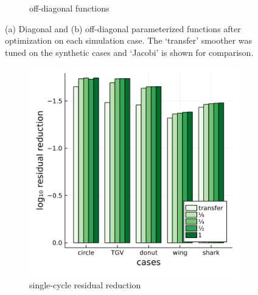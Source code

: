 \documentclass[review]{elsarticle}
\begin{document}
\begin{figure}
\begin{subfigure}[b]{0.47\textwidth}
        \caption{off-diagonal functions}
        \label{fig:simulation time}
    \end{subfigure}
        \caption{(a) Diagonal and (b) off-diagonal parameterized functions after optimization on each simulation case. The `transfer' smoother was tuned on the synthetic cases and `Jacobi' is shown for comparison.}
        \label{fig:tuned simulation}
\end{figure}

\begin{figure}
    \centering
    \begin{subfigure}[b]{0.47\textwidth}
        \centering
        \includegraphics[width=\textwidth]{figures/scaleloss.png}
        \caption{single-cycle residual reduction}
        \label{fig:scaled loss}
    \end{subfigure}
    \hfill
    \begin{subfigure}[b]{0.47\textwidth}
        \centering

\end{subfigure}
\end{figure}
\end{document}

